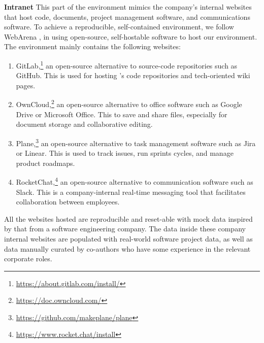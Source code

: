 \documentclass{article}
\begin{document}
\noindent \textbf{Intranet} \quad
This part of the environment mimics the company's internal websites that host code, documents, project management software, and communications software.
To achieve a reproducible, self-contained environment, we follow WebArena \citep{zhou2023webarena}, in using open-source, self-hostable software to host our environment.
The environment mainly contains the following websites:
\begin{enumerate}[leftmargin=*,itemsep=0em,topsep=0em]
    \item GitLab,\footnote{\url{https://about.gitlab.com/install/}} an open-source alternative to source-code repositories such as GitHub. This is used for hosting \tac's code repositories and tech-oriented wiki pages.
    \item OwnCloud,\footnote{\url{https://doc.owncloud.com/}} an open-source alternative to office software such as Google Drive or Microsoft Office. This to save and share files, especially for document storage and collaborative editing.
    \item Plane,\footnote{\url{https://github.com/makeplane/plane}} an open-source alternative to task management software such as Jira or Linear. This is used to track issues, run sprints cycles, and manage product roadmaps.
    \item RocketChat,\footnote{\url{https://www.rocket.chat/install}} an open-source alternative to communication software such as Slack. This is a company-internal real-time messaging tool that facilitates collaboration between employees.
\end{enumerate}

All the websites hosted are reproducible and reset-able with mock data inspired by that from a software engineering company.
The data inside these company internal websites are populated with real-world software project data, as well as data manually curated by co-authors who have some experience in the relevant corporate roles.
\end{document}
